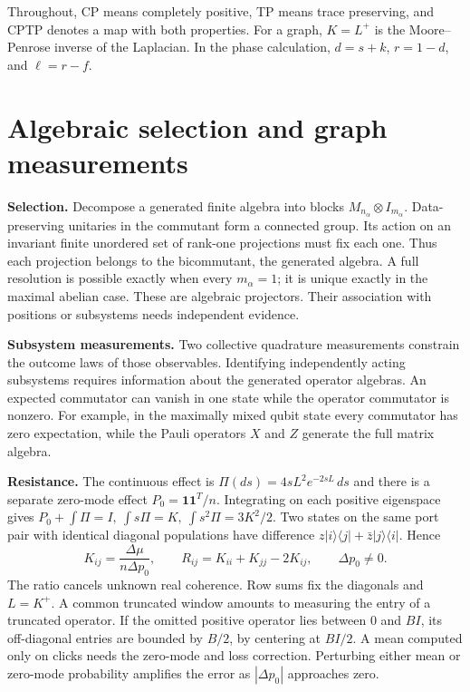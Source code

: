 \documentclass[
  10pt,
  a4paper,
]{article}
\begin{document}
Throughout, CP means completely positive, TP means trace preserving, and CPTP denotes a map with both properties. For a graph, \(K=L^+\) is the Moore--Penrose inverse of the Laplacian. In the phase calculation, \(d=s+k\), \(r=1-d\), and \(\ell=r-f\).

\newpage

\section{Algebraic selection and graph measurements}\label{algebraic-selection-and-graph-measurements}

\textbf{Selection.} Decompose a generated finite algebra into blocks \(M_{n_\alpha}\otimes I_{m_\alpha}\). Data-preserving unitaries in the commutant form a connected group. Its action on an invariant finite unordered set of rank-one projections must fix each one. Thus each projection belongs to the bicommutant, the generated algebra. A full resolution is possible exactly when every \(m_\alpha=1\); it is unique exactly in the maximal abelian case. These are algebraic projectors. Their association with positions or subsystems needs independent evidence.

\textbf{Subsystem measurements.} Two collective quadrature measurements constrain the outcome laws of those observables. Identifying independently acting subsystems requires information about the generated operator algebras. An expected commutator can vanish in one state while the operator commutator is nonzero. For example, in the maximally mixed qubit state every commutator has zero expectation, while the Pauli operators \(X\) and \(Z\) generate the full matrix algebra.

\textbf{Resistance.} The continuous effect is \(\Pi(ds)=4sL^2e^{-2sL}\,ds\) and there is a separate zero-mode effect \(P_0=\mathbf1\mathbf1^T/n\). Integrating on each positive eigenspace gives \(P_0+\int\Pi=I,\ \int s\Pi=K,\ \int s^2\Pi=3K^2/2\). Two states on the same port pair with identical diagonal populations have difference \(z|i\rangle\langle j|+\bar z|j\rangle\langle i|\). Hence \[
 K_{ij}=\frac{\Delta\mu}{n\Delta p_0},\qquad
 R_{ij}=K_{ii}+K_{jj}-2K_{ij},\qquad \Delta p_0\ne0 .
\] The ratio cancels unknown real coherence. Row sums fix the diagonals and \(L=K^+\). A common truncated window amounts to measuring the entry of a truncated operator. If the omitted positive operator lies between \(0\) and \(BI\), its off-diagonal entries are bounded by \(B/2\), by centering at \(BI/2\). A mean computed only on clicks needs the zero-mode and loss correction. Perturbing either mean or zero-mode probability amplifies the error as \(|\Delta p_0|\) approaches zero.
\end{document}
